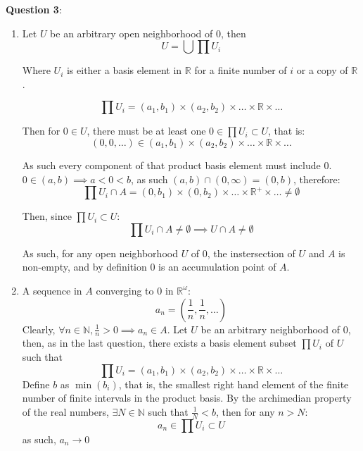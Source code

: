 \documentclass{article} %
\newcommand{\question}[2][]{
  \begin{flushleft}
    \textbf{Question #1}: \textit{#2}

\end{flushleft}}
\begin{document}
\question[3]{}
\begin{enumerate}
  \item Let $U$ be an arbitrary open neighborhood of $0$, then
    $$
    U = \bigcup \prod U_i
    $$

    Where $U_i$ is either a basis element in $\mathbb{R}$ for a finite
    number of $i$ or a copy of $\mathbb{R}$.

    $$
    \prod U_i = (a_1, b_1) \times  (a_2, b_2) \times \hdots \times
    \mathbb{R} \times  \hdots
    $$

    Then for $0 \in U$, there must be at least one $0 \in \prod U_i
    \subset U$, that is:
    $$
    (0, 0, \hdots)\in(a_1, b_1) \times  (a_2, b_2) \times \hdots \times
    \mathbb{R} \times  \hdots
    $$

    As such every component of that product basis element must include
    $0$. $0 \in (a,b)\implies a < 0 < b$, as such $(a, b) \cap (0,
    \infty) = (0, b)$, therefore:
    \[
      \prod U_i \cap A = (0, b_1) \times (0, b_2) \times \hdots \times
      \mathbb{R}^+ \times \hdots \neq \emptyset
    \]

    Then, since $\prod U_i \subset U$:
    \[
      \prod U_i \cap A  \neq \emptyset \implies U \cap A \neq\emptyset
    \]

    As such, for any open neighborhood $U$ of $0$, the instersection of
    $U$ and $A$ is non-empty, and by definition $0$ is an
    accumulation point of $A$.
  \item A sequence in $A$ converging to $0$ in $\mathbb{R}^\omega$:
    $$
    a_n = \left(\frac{1}{n},\frac{1}{n}, \hdots\right)
    $$
    Clearly, $\forall n \in \mathbb{N}, \frac{1}{n} > 0 \implies a_n
    \in A$. Let $U$ be an arbitrary neighborhood of $0$, then, as in the last
    question, there exists a basis element subset $\prod U_i$ of $U$ such that
    \[
      \prod U_i = (a_1, b_1) \times (a_2, b_2) \times \hdots \times \mathbb{R}
      \times  \hdots
    \]
    Define $b$ as $\min(b_i)$, that is, the smallest right hand element of the
    finite number of finite intervals in the product basis. By the
    archimedian property of the real numbers, $\exists N \in
    \mathbb{N}$ such that $\frac{1}{N} < b$, then for any $n > N$:
    \[
      a_n \in  \prod U_i \subset U
    \]
    as such, $a_n \to 0$
\end{enumerate}
\end{document}
